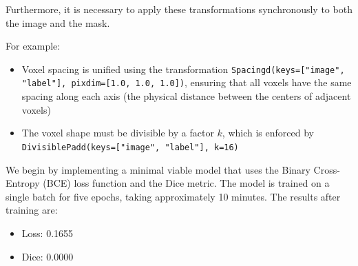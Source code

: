Furthermore, it is necessary to apply these transformations synchronously to both the image and the mask.

For example:

\begin{itemize}
    \item Voxel spacing is unified using the transformation \texttt{Spacingd(keys=["image", "label"], pixdim=[1.0, 1.0, 1.0])}, ensuring that all voxels have the same spacing along each axis (the physical distance between the centers of adjacent voxels)
    \item The voxel shape must be divisible by a factor $k$, which is enforced by \texttt{DivisiblePadd(keys=["image", "label"], k=16)}
  
\end{itemize}

We begin by implementing a minimal viable model that uses the Binary Cross-Entropy (BCE) loss function and the Dice metric. The model is trained on a single batch for five epochs, taking approximately 10 minutes. The results after training are:

\begin{itemize}
    \item Loss: 0.1655
    \item Dice: 0.0000
\end{itemize}

